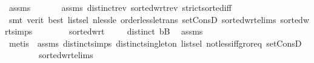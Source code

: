 \begin{isabellebody}
\ assms{\isacharparenleft}{\kern0pt}{}{\isacharparenright}{\kern0pt}\ {}\isanewline
\ \ \ \ \isamarkupfalse%
\ assms{\isacharparenleft}{\kern0pt}{}{\isacharparenright}{\kern0pt}\ distinct{\isacharunderscore}{\kern0pt}rev\ sorted{\isacharunderscore}{\kern0pt}wrt{\isacharunderscore}{\kern0pt}rev\ strict{\isacharunderscore}{\kern0pt}sorted{\isacharunderscore}{\kern0pt}iff\ \isanewline
\ \ \ \ \isamarkupfalse%
\ {\isacharparenleft}{\kern0pt}smt\ {\isacharparenleft}{\kern0pt}verit{\isacharcomma}{\kern0pt}\ best{\isacharparenright}{\kern0pt}\ list{\isachardot}{\kern0pt}sel{\isacharparenleft}{\kern0pt}{}{\isacharparenright}{\kern0pt}\ nless{\isacharunderscore}{\kern0pt}le\ order{\isacharunderscore}{\kern0pt}less{\isacharunderscore}{\kern0pt}le{\isacharunderscore}{\kern0pt}trans\ set{\isacharunderscore}{\kern0pt}ConsD\ sorted{\isacharunderscore}{\kern0pt}wrt{\isachardot}{\kern0pt}elims{\isacharparenleft}{\kern0pt}{}{\isacharparenright}{\kern0pt}\ sorted{\isacharunderscore}{\kern0pt}wrt{\isachardot}{\kern0pt}simps{\isacharparenleft}{\kern0pt}{}{\isacharparenright}{\kern0pt}\isanewline
\ \ \ \ \ \ \ \ sorted{\isacharunderscore}{\kern0pt}wrt{}{\isacharparenright}{\kern0pt}\isanewline
\ \ \isamarkupfalse%
\ {}{\isacharcolon}{\kern0pt}\ {\isachardoublequoteopen}distinct\ {\isacharparenleft}{\kern0pt}b{\isacharhash}{\kern0pt}B{\isacharparenright}{\kern0pt}{\isachardoublequoteclose}\ \isamarkupfalse%
\ assms\ {}\ {}\ \isanewline
\ \ \ \ \isamarkupfalse%
\ {\isacharparenleft}{\kern0pt}metis\ {\isachardoublequoteopen}{}{\isachardoublequoteclose}\ assms{\isacharparenleft}{\kern0pt}{}{\isacharcomma}{\kern0pt}{}{\isacharparenright}{\kern0pt}\ distinct{\isachardot}{\kern0pt}simps{\isacharparenleft}{\kern0pt}{}{\isacharparenright}{\kern0pt}\ distinct{\isacharunderscore}{\kern0pt}singleton\ list{\isachardot}{\kern0pt}sel{\isacharparenleft}{\kern0pt}{}{\isacharparenright}{\kern0pt}\ not{\isacharunderscore}{\kern0pt}less{\isacharunderscore}{\kern0pt}iff{\isacharunderscore}{\kern0pt}gr{\isacharunderscore}{\kern0pt}or{\isacharunderscore}{\kern0pt}eq\ set{\isacharunderscore}{\kern0pt}ConsD\isanewline
\ \ \ \ \ \ \ \ sorted{\isacharunderscore}{\kern0pt}wrt{\isachardot}{\kern0pt}elims{\isacharparenleft}{\kern0pt}{}{\isacharparenright}{\kern0pt}{\isacharparenright}{\kern0pt}\isanewline
\ \ \ \ \isamarkupfalse%

\end{isabellebody}
